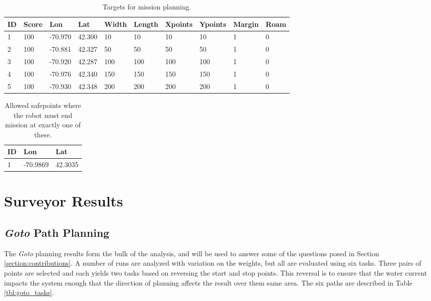 \documentclass{tamuccthesis}
\begin{document}
\begin{table}[H]\small
    \begin{tabular}{|l|l|l|l|l|l|l|l|l|l|}
\hline
ID & Score & Lon & Lat & Width & Length & Xpoints & Ypoints & Margin & Roam \\
\hline
1 & 100 & -70.970 & 42.300 & 10 & 10 & 10 & 10 & 1 & 0 \\
\hline
2 & 100 & -70.881 & 42.327 & 50 & 50 & 50 & 50 & 1 & 0 \\
\hline
3 & 100 & -70.920 & 42.287 & 100 & 100 & 100 & 100 & 1 & 0 \\
\hline
4 & 100 & -70.976 & 42.340 & 150 & 150 & 150 & 150 & 1 & 0 \\
\hline
5 & 100 & -70.930 & 42.348 & 200 & 200 & 200 & 200 & 1 & 0 \\
\hline  
        
    \end{tabular}
    \caption[Targets for mission planning.]{Targets for mission planning.}
    \label{tbl:targets}
\end{table}

\begin{table}[H]\small
    \begin{tabular}{|l|l|l|}
\hline
ID & Lon & Lat\\
\hline
1 & -70.9869 & 42.3035 \\
\hline  
    \end{tabular}
    \caption[Robot safepoints.]{Allowed safepoints where the robot must end mission at exactly one of these.}
    \label{tbl:safepoints}
\end{table}

\section{Surveyor Results}

\subsection{\textit{Goto} Path Planning}

The \textit{Goto} planning results form the bulk of the analysis, and will be used to answer some of the questions posed in Section \ref{section:contributions}. A number of runs are analyzed with variation on the weights, but all are evaluated using six  tasks. Three pairs of points are selected and each yields two tasks based on reversing the start and stop points. This reversal is to ensure that the water current impacts the system enough that the direction of planning affects the result over them same area. The six paths are described in Table \ref{tbl:goto_tasks}.
\end{document}
